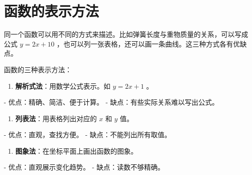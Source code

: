 \section*{函数的表示方法}


\begin{explore}


同一个函数可以用不同的方式来描述。比如弹簧长度与重物质量的关系，可以写成公式 $y = 2x + 10$ ，也可以列一张表格，还可以画一条曲线。这三种方式各有优缺点。

\end{explore}

\begin{understand}


函数的三种表示方法：

\begin{enumerate}
  \item \textbf{解析式法}：用数学公式表示。如 $y = 2x + 1$ 。
\end{enumerate}

   - 优点：精确、简洁、便于计算。
   - 缺点：有些实际关系难以写出公式。

\begin{enumerate}
  \item \textbf{列表法}：用表格列出对应的 $x$ 和 $y$ 值。
\end{enumerate}

   - 优点：直观，查找方便。
   - 缺点：不能列出所有取值。

\begin{enumerate}
  \item \textbf{图象法}：在坐标平面上画出函数的图象。
\end{enumerate}

   - 优点：直观展示变化趋势。
   - 缺点：读数不够精确。

\end{understand}

